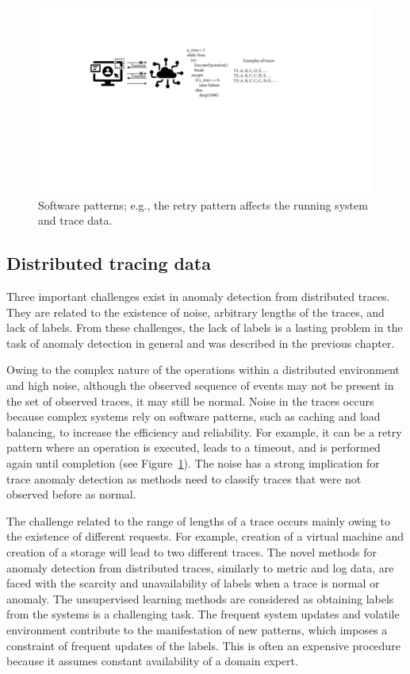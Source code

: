\begin{figure}[!htbp]
     \centering
     \includegraphics[width=0.99\textwidth]{gfx/chap3/traceschallenges.pdf}
     \caption{Software patterns; e.g., the retry pattern affects the running system and trace data.}
     \label{fig:tracechallenges}
\end{figure}

\subsection{Distributed tracing data}\label{ch:concepts:sec:anomalydetectionindistributedsoftwaresystems:subsec:trace}
Three important challenges exist in anomaly detection from distributed traces. They are related to the existence of noise, arbitrary lengths of the traces, and lack of labels. From these challenges, the lack of labels is a lasting problem in the task of anomaly detection in general and was described in the previous chapter.

Owing to the complex nature of the operations within a distributed environment and high noise, although the observed sequence of events may not be present in the set of observed traces, it may still be normal. Noise in the traces occurs because complex systems rely on software patterns, such as caching and load balancing, to increase the efficiency and reliability. For example, it can be a retry pattern where an operation is executed, leads to a timeout, and is performed again until completion (see Figure~\ref{fig:tracechallenges}). The noise has a strong implication for trace anomaly detection as methods need to classify traces that were not observed before as normal. 

The challenge related to the range of lengths of a trace occurs mainly owing to the existence of different requests. For example, creation of a virtual machine and creation of a storage will lead to two different traces. The novel methods for anomaly detection from distributed traces, similarly to metric and log data, are faced with the scarcity and unavailability of labels when a trace is normal or anomaly. The unsupervised learning methods are considered as obtaining labels from the systems is a challenging task. The frequent system updates and volatile environment contribute to the manifestation of new patterns, which imposes a constraint of frequent updates of the labels. This is often an expensive procedure because it assumes constant availability of a domain expert.


